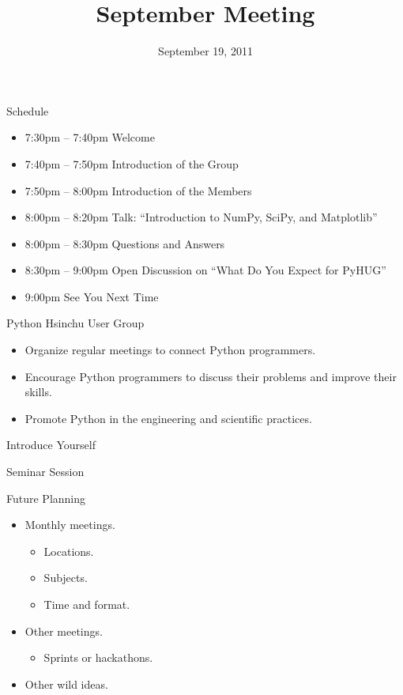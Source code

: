 \documentclass[dvips,xcolor=pst]{beamer}
\title{September Meeting}
\institute{Python Hsinchu User Group}
\date[2011/9/19]{September 19, 2011}
\begin{document}
\begin{frame}
\titlepage
\end{frame}

\begin{frame}{
%
Schedule
%
}
\begin{itemize} \large
  \item 7:30pm -- 7:40pm Welcome
  \item 7:40pm -- 7:50pm Introduction of the Group
  \item 7:50pm -- 8:00pm Introduction of the Members
  \item 8:00pm -- 8:20pm Talk: ``Introduction to NumPy, SciPy, and Matplotlib''
  \item 8:00pm -- 8:30pm Questions and Answers
  \item 8:30pm -- 9:00pm Open Discussion on ``What Do You Expect for PyHUG''
  \item 9:00pm See You Next Time
\end{itemize}
\end{frame}

\begin{frame}{
%
Python Hsinchu User Group
%
}
\begin{itemize} \large
  \item Organize regular meetings to connect Python programmers.
  \item Encourage Python programmers to discuss their problems and improve
  their skills.
  \item Promote Python in the engineering and scientific practices.
\end{itemize}
\end{frame}

\begin{frame}{
%
%
}
\begin{center} \Huge
  Introduce Yourself
\end{center}
\end{frame}

\begin{frame}{
%
%
}
\begin{center} \Huge
  Seminar Session
\end{center}
\end{frame}

\begin{frame}{
%
Future Planning
%
}
\begin{itemize} \large
  \item Monthly meetings.
  \begin{itemize} \large
    \item Locations.
    \item Subjects.
    \item Time and format.
  \end{itemize}
  \item Other meetings.
  \begin{itemize} \large
    \item Sprints or hackathons.
  \end{itemize}
  \item Other wild ideas.
\end{itemize}
\end{frame}
\end{document}
